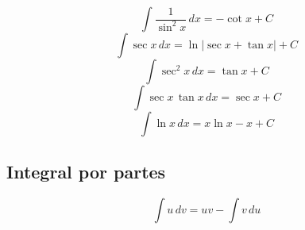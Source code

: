 \documentclass[a4paper,12pt,numbers=noenddot]{scrreprt}
\begin{document}
\begin{multicols}{2}
\begin{equation*}
            \int \frac{1}{\sin^2 x} \, dx = -\cot x + C
        \end{equation*}
        \begin{equation*}
            \int \sec x \, dx = \ln |\sec x + \tan x| + C
        \end{equation*}
        \begin{equation*}
            \int \sec^2 x \, dx = \tan x + C
        \end{equation*}
        \begin{equation*}
            \int \sec x \, \tan x \, dx = \sec x + C
        \end{equation*}
        \begin{equation*}
            \int \ln x \, dx = x \ln x - x + C
        \end{equation*}

    \end{multicols}

    \subsection*{Integral por partes}
        \begin{equation*}
            \int u \, dv = uv - \int v \, du
        \end{equation*}
\end{document}
